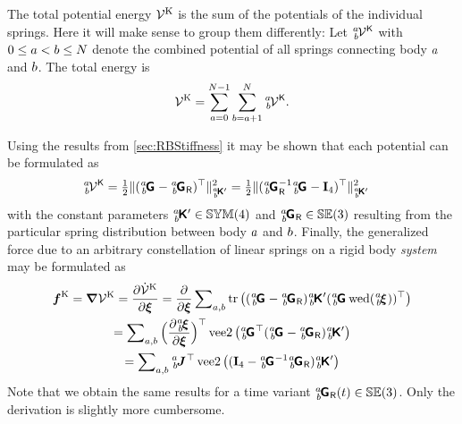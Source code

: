 The total potential energy $\mathcal{V}^{\mathrm{K}}$ is the sum of the potentials of the individual springs.
Here it will make sense to group them differently:
Let $\bodyPotentialStiff{\BidxI}{\BidxII}$ with $0 \leq a < b \leq N$ denote the combined potential of all springs connecting body $a$ and $b$.
The total energy is
\begin{align}
 \potentialStiff
 = \sum_{\BidxI=0}^{\numRigidBodies-1} \sum_{\BidxII=\BidxI+1}^{\numRigidBodies} \bodyPotentialStiff{\BidxI}{\BidxII}
 .
\end{align}

Using the results from \autoref{sec:RBStiffness} it may be shown that each potential can be formulated as
\begin{align}
 \bodyPotentialStiff{\BidxI}{\BidxII} &= \tfrac{1}{2} \norm[\bodyStiffMatp{\BidxI}{\BidxII}]{(\bodyHomoCoord{\BidxI}{\BidxII} - \bodyHomoCoordR{\BidxI}{\BidxII})^\top}^2
 = \tfrac{1}{2} \norm[\bodyStiffMatp{\BidxI}{\BidxII}]{(\bodyHomoCoordR{\BidxI}{\BidxII}^{-1} \bodyHomoCoord{\BidxI}{\BidxII} - \idMat[4])^\top}^2
\end{align}
with the constant parameters $\bodyStiffMatp{\BidxI}{\BidxII} \in \SymMat(4)$ and $\bodyHomoCoordR{\BidxI}{\BidxII}\in \SpecialEuclideanGroup(3)$ resulting from the particular spring distribution between body $a$ and $b$.
Finally, the generalized force due to an arbitrary constellation of linear springs on a rigid body \textit{system} may be formulated as
\begin{multline}\label{eq:RBSGenForceStiff}
 \genForceStiff = \differential\potentialStiff
 = \frac{\partial \potentialStiffd}{\partial \sysVel}
 = \frac{\partial}{\partial \sysVel} \sumBodiesAB \tr\big((\bodyHomoCoord{\BidxI}{\BidxII} - \bodyHomoCoordR{\BidxI}{\BidxII}) \bodyStiffMatp{\BidxI}{\BidxII} (\bodyHomoCoord{\BidxI}{\BidxII} \wedOp(\bodyVel{\BidxI}{\BidxII}))^\top \big)
\\ 
 = \sumBodiesAB \Big(\frac{\partial \bodyVel{\BidxI}{\BidxII}}{\partial \sysVel}\Big)^\top \veeTwoOp\big(\bodyHomoCoord{\BidxI}{\BidxII}^\top (\bodyHomoCoord{\BidxI}{\BidxII} - \bodyHomoCoordR{\BidxI}{\BidxII}) \bodyStiffMatp{\BidxI}{\BidxII} \big)
\\
 = \sumBodiesAB \bodyJac{\BidxI}{\BidxII}^\top \veeTwoOp\big((\idMat[4] - \bodyHomoCoord{\BidxI}{\BidxII}^{-1} \bodyHomoCoordR{\BidxI}{\BidxII}) \bodyStiffMatp{\BidxI}{\BidxII} \big)
\end{multline}
Note that we obtain the same results for a time variant $\bodyHomoCoordR{\BidxI}{\BidxII}(t)\in \SpecialEuclideanGroup(3)$.
Only the derivation is slightly more cumbersome.


